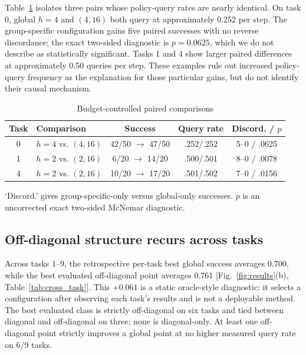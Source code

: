 Table~\ref{tab:budget} isolates three pairs whose policy-query rates are nearly
identical.  On task 0, global $h=4$ and $(4,16)$ both query at approximately
0.252 per step.  The group-specific configuration gains five paired successes
with no reverse discordance; the exact two-sided diagnostic is $p=0.0625$, which
we do not describe as statistically significant.  Tasks 1 and 4 show larger
paired differences at approximately 0.50 queries per step.  These examples rule
out increased policy-query frequency as the explanation for those particular
gains, but do not identify their causal mechanism.

\begin{table}[t]
\caption{Budget-controlled paired comparisons}
\label{tab:budget}
\centering
\scriptsize
\setlength{\tabcolsep}{2.4pt}
\begin{tabular}{clccc}
\toprule
Task & Comparison & Success & Query rate & Discord. / $p$ \\
\midrule
0 & $h=4$ vs. $(4,16)$ & 42/50 $\to$ 47/50 & .252/.252 & 5--0 / .0625 \\
1 & $h=2$ vs. $(2,16)$ & 6/20 $\to$ 14/20 & .500/.501 & 8--0 / .0078 \\
4 & $h=2$ vs. $(2,16)$ & 10/20 $\to$ 17/20 & .501/.502 & 7--0 / .0156 \\
\bottomrule
\end{tabular}
\vspace{-1mm}
\begin{flushleft}\footnotesize
`Discord.' gives group-specific-only versus global-only successes.  $p$ is an
uncorrected exact two-sided McNemar diagnostic.
\end{flushleft}
\end{table}

\subsection{Off-diagonal structure recurs across tasks}

Across tasks 1--9, the retrospective per-task best global success averages
0.700, while the best evaluated off-diagonal point averages 0.761
[Fig.~\ref{fig:results}(b), Table~\ref{tab:cross_task}].  This $+0.061$ is a static oracle-style diagnostic:
it selects a configuration after observing each task's results and is not a
deployable method.  The best evaluated class is strictly off-diagonal on six
tasks and tied between diagonal and off-diagonal on three; none is diagonal-only.
At least one off-diagonal point strictly improves a global point at no higher
measured query rate on 6/9 tasks.

